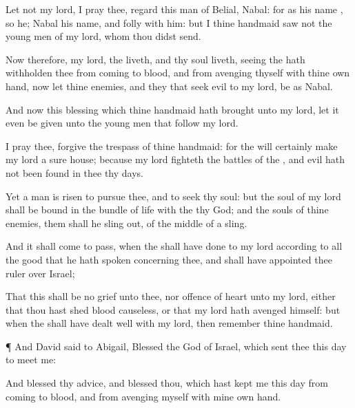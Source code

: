 {Let not my
lord, I pray thee,
regard this
man of
Belial,
{}
Nabal: for as his
name
{}, so
{} he;
Nabal
{} his
name, and
folly
{} with him: but I thine
handmaid
saw not the young
men of my
lord, whom thou didst
send.

Now therefore, my
lord,
{} the
{}
liveth, and
{} thy
soul
liveth, seeing the
{} hath
withholden thee from
coming to
{}
blood, and from
avenging thyself with thine own
hand, now let thine
enemies, and they that
seek
evil to my
lord, be as
Nabal.

And now this
blessing which thine
handmaid hath
brought unto my
lord, let it even be
given unto the young
men that
follow my
lord.

I pray thee,
forgive the
trespass of thine
handmaid: for the
{} will
certainly
make my
lord a
sure
house; because my
lord
fighteth the
battles of the
{}, and
evil hath not been
found in thee
{} thy
days.

Yet a
man is
risen to
pursue thee, and to
seek thy
soul: but the
soul of my
lord shall be
bound in the
bundle of
life with the
{} thy
God; and the
souls of thine
enemies, them shall he sling
out,
{} of the
middle of a
sling.

And it shall come to pass, when the
{} shall have
done to my
lord according to all the
good that he hath
spoken concerning thee, and shall have
appointed thee
ruler over
Israel;

That this shall be no
grief unto thee, nor
offence of
heart unto my
lord, either that thou hast
shed
blood
causeless, or that my
lord hath
avenged himself: but when the
{} shall have dealt
well with my
lord, then
remember thine
handmaid.


\par }{\PP {}¶ And
David
said to
Abigail,
Blessed
{} the
{}
God of
Israel, which
sent thee this
day to
meet me:

And
blessed
{} thy
advice, and
blessed
{} thou, which hast
kept me this
day from
coming to
{}
blood, and from
avenging myself with mine own
hand.

}
